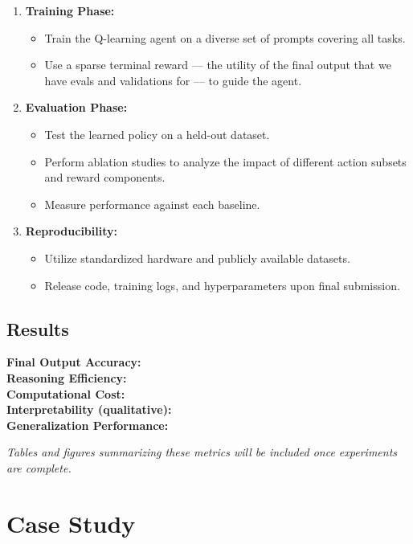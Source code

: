 \documentclass[10pt,journal,compsoc]{IEEEtran}
\begin{document}
\begin{enumerate}
\item
  \textbf{Training Phase:}
  \begin{itemize}
  \item
    Train the Q-learning agent on a diverse set of prompts covering all
    tasks.
  \item
    Use a sparse terminal reward --- the utility of the final output that
    we have evals and validations for --- to guide the agent.
  \end{itemize}
\item
  \textbf{Evaluation Phase:}

  \begin{itemize}
  \item
    Test the learned policy on a held-out dataset.
  \item
    Perform ablation studies to analyze the impact of different action
    subsets and reward components.
  \item
    Measure performance against each baseline.
  \end{itemize}
\item
  \textbf{Reproducibility:}

  \begin{itemize}
  \item
    Utilize standardized hardware and publicly available datasets.
  \item
    Release code, training logs, and hyperparameters upon final
    submission.
  \end{itemize}
\end{enumerate}


\subsection{Results}

\textbf{Final Output Accuracy:} \\
\textbf{Reasoning Efficiency:} \\
\textbf{Computational Cost:} \\
\textbf{Interpretability (qualitative):} \\
\textbf{Generalization Performance:}

\emph{Tables and figures summarizing these metrics will be included once
experiments are complete.}

\section{Case Study}
\end{document}
